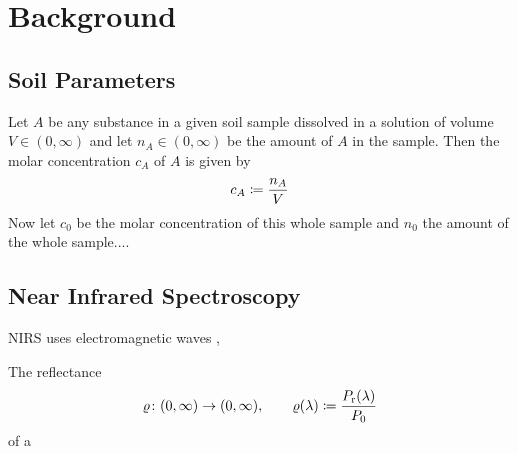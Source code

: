 \section{Background}
\label{sec:background}
	
	\subsection{Soil Parameters}
	\label{ssec:soil-parameters}
	
		Let $A$ be any substance in a given soil sample dissolved in a solution of volume $V\in(0,\infty)$ and let $n_A\in(0,\infty)$ be the amount of $A$ in the sample.
		Then the molar concentration $c_A$ of $A$ is given by
		\[
			c_A \coloneqq \frac{n_A}{V}
		\]
		Now let $c_0$ be the molar concentration of this whole sample and $n_0$ the amount of the whole sample....
		
	

	\subsection{Near Infrared Spectroscopy}
	\label{ssec:nirs}
	
		NIRS uses electromagnetic waves \cite[246]{agelet:10a},
		 
		The reflectance 
		\[
			\varrho\colon(0,\infty)\to(0,\infty),\qquad \varrho(\lambda) \coloneqq \frac{P_{\mathrm{r}}(\lambda)}{P_0}
		\]
		of a 


